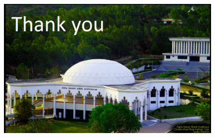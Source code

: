 \documentclass{beamer}
\begin{document}
{\begin{thebibliography}{99}
		
			\end{thebibliography}
	\begin{frame}
		\justifying
		\begin{figure}[h]
			\centering
			\includegraphics[width=0.99\textwidth]{GIK1.eps}\\
		\end{figure}
	\end{frame}			
			
			
			
			
			
}	
	
	
	
	
	
	
	
	
	
	
	
	
	
	
	
\end{document}
